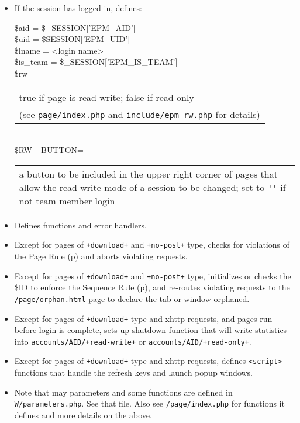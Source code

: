 \documentclass[12pt]{article}
\newcommand{\EOL}{\penalty \exhyphenpenalty}
\newcommand{\pagref}[1]{p\pageref{#1}}
\begin{document}
\begin{enumerate}
\begin{itemize}
\item If the session has logged in, defines:
\\[2ex]
\hspace*{0.2in}\begin{minipage}{5in}
\$aid = \$\_SESSION['EPM\_AID'] \\
\$uid = \$SESSION['EPM\_UID'] \\
\$lname = <login name> \\
\$is\_team = \$\_SESSION['EPM\_IS\_TEAM'] \\
\$rw = \begin{tabular}[t]{@{}l@{}}
       true if page is read-write; false if read-only \\
       (see {\tt page/index.php} and {\tt include/epm\_rw.php} for details)
       \end{tabular} \\
\$RW \_BUTTON= \begin{tabular}[t]{@{}p{3.5in}@{}}
       a button to be included in the upper right corner of pages that
       allow the read-write mode of a session to be changed; set to
       \verb/''/
       if not team member login
       \end{tabular}
\end{minipage}

\item Defines functions and error handlers.

\item Except for pages of {\tt +download+} and {\tt +no-post+} type,
      checks for violations of the Page Rule (\pagref{PAGE-RULE})
      and aborts violating requests.

\item Except for pages of {\tt +download+} and {\tt +no-post+} type,
      initializes or checks the \$ID to enforce the
      Sequence Rule (\pagref{SEQUENCE-RULE}), and
      re-routes violating requests
      to the {\tt /page/orphan.html} page to declare
      the tab or window orphaned.

\item Except for pages of {\tt +download+} type and xhttp requests,
      and pages run before login is complete,
      sets up shutdown function that will write statistics
      into {\tt accounts/\EOL AID/\EOL +read-write+} or
      {\tt accounts/\EOL AID/\EOL +read-only+}.
\item Except for pages of {\tt +download+} type and xhttp requests,
      defines {\tt <script>} functions that handle the refresh keys and
      launch popup windows.

\item Note that may parameters and some functions are defined in
      {\tt W/parameters.php}.  See that file.  Also see
      {\tt /page/index.php} for functions it defines and more details
      on the above.


\end{itemize}

\end{enumerate}
\end{document}
